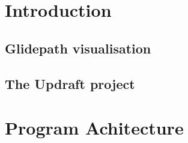 \documentclass[12pt,a4paper]{refart}
\begin{document}

\clearpage


\section{Introduction}

\subsection{Glidepath visualisation}

\subsection{The Updraft project}




\clearpage





\clearpage







\clearpage

\section{Program Achitecture}
\end{document}
